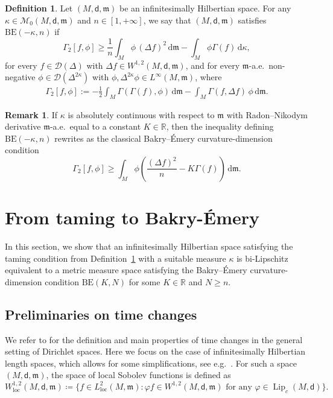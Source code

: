 \documentclass[10pt]{article}
\newcommand{\m}{\mathfrak{m}}
\newcommand{\M}{{\mathit{M}}}
\renewcommand{\d}{\,\mathrm{d}}
\newcommand{\D}{\mathscr{D}}
\newcommand{\dist}{\mathsf{d}}
\newcommand{\df}{\coloneqq}
\DeclareMathOperator{\Lip}{Lip}
\newcommand{\BE}{{\mathrm{BE}}}
\theoremstyle{plain}
\theoremstyle{definition}
\newtheorem{definition}[theorem]{Definition}
\newtheorem{remark}[theorem]{Remark}
\newcommand{\Linf}{L^{\infty}(M,\m)}
\newcommand{\Sob}{W^{1,2}(M,\dist,\m)}
\newcommand{\Ltwoloc}{L^2_{\text{loc}}(M,\m)}
\newcommand{\Sobloc}{W^{1,2}_{\text{loc}}(M,\dist,\m)}
\begin{document}
\begin{definition}\label{Def:BE}
Let $ (M,\dist,\m)$ be an infinitesimally Hilbertian space. For any $\kappa \in \mathcal{M}_0(M,\dist,\m)$  and $n \in [1,+\infty]$, we say that $(M,\dist,\m)$ satisfies $\mathrm{BE}(-\kappa,n)$ if
\begin{equation*}
\Gamma_2[f,\phi] \ge \frac{1}{n} \int_M \phi \,  (\Delta f)^2 \d \m - \int_M \phi  \Gamma(f) \d \kappa,
\end{equation*}
for every $f \in \D(\Delta)$ with $\Delta f \in \Sob$, and for every $\m$-a.e.~non-negative $\phi \in \D(\Delta^{2\kappa})$ with $\phi,\Delta^{2\kappa} \phi \in \Linf$, where
\begin{align*}
    \Gamma_2[f,\phi] := -\frac{1}{2}\int_\M\Gamma(\Gamma(f),\phi)\d\m - \int_\M\Gamma(f,\Delta f)\,\phi\d\m.
\end{align*}

\begin{remark}
    If $\kappa$ is absolutely continuous with respect to $\m$ with Radon--Nikodym derivative $\m$-a.e.~equal to a constant $K \in \mathbb{R}$, then the inequality defining $\BE(-\kappa,n)$ rewrites as the classical Bakry--\'Emery curvature-dimension condition \begin{equation*}
\Gamma_2[f,\phi] \ge  \int_M \phi  \left( \frac{(\Delta f)^2}{n}- K\Gamma(f)\right)\d \m.
\end{equation*}
\end{remark}
\end{definition}


\section{From taming to Bakry-\'Emery}

In this section, we show that an infinitesimally Hilbertian space satisfying the taming condition from Definition~\ref{Def:BE} with a suitable measure $\kappa$ is bi-Lipschitz equivalent to a metric measure space satisfying the Bakry--\'Emery curvature-dimension condition $\BE(K,N)$ for some $K \in \mathbb{R}$ and $N\ge n$.

\subsection{Preliminaries on time changes}


We refer to \cite[Chapter 5]{CF} for the definition and main properties of time changes in the general setting of Dirichlet spaces. Here we focus on the case of infinitesimally Hilbertian length spaces, which allows for some simplifications, see e.g.~\cite{SturmGAFA,hansturm}. For such a space $(M,\dist,\m)$, the space of local Sobolev functions is defined as
\[
\Sobloc \df \{f \in \Ltwoloc : \varphi f \in \Sob \text{ for any } \varphi\in \Lip_c(M,\dist)\}.
\]
\end{document}
